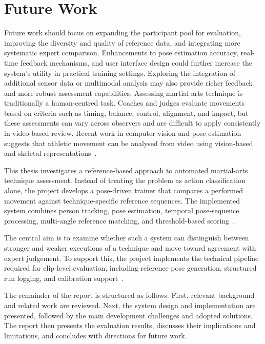 \documentclass[12pt]{article}
\begin{document}
\section{Future Work}
Future work should focus on expanding the participant pool for evaluation, improving the diversity and quality of reference data, and integrating more systematic expert comparison. Enhancements to pose estimation accuracy, real-time feedback mechanisms, and user interface design could further increase the system's utility in practical training settings. Exploring the integration of additional sensor data or multimodal analysis may also provide richer feedback and more robust assessment capabilities.
Assessing martial-arts technique is traditionally a human-centred task. Coaches and judges evaluate movements based on criteria such as timing, balance, control, alignment, and impact, but these assessments can vary across observers and are difficult to apply consistently in video-based review. Recent work in computer vision and pose estimation suggests that athletic movement can be analysed from video using vision-based and skeletal representations~\cite{echeverria2021karate,quinn2024automation,wu2024blazepose}.

This thesis investigates a reference-based approach to automated martial-arts technique assessment. Instead of treating the problem as action classification alone, the project develops a pose-driven trainer that compares a performed movement against technique-specific reference sequences. The implemented system combines person tracking, pose estimation, temporal pose-sequence processing, multi-angle reference matching, and threshold-based scoring~\cite{actionRecognition}.

The central aim is to examine whether such a system can distinguish between stronger and weaker executions of a technique and move toward agreement with expert judgement. To support this, the project implements the technical pipeline required for clip-level evaluation, including reference-pose generation, structured run logging, and calibration support~\cite{calibrateThresholds,runReferenceCollectionBatch}.

The remainder of the report is structured as follows. First, relevant background and related work are reviewed. Next, the system design and implementation are presented, followed by the main development challenges and adopted solutions. The report then presents the evaluation results, discusses their implications and limitations, and concludes with directions for future work.
\end{document}
